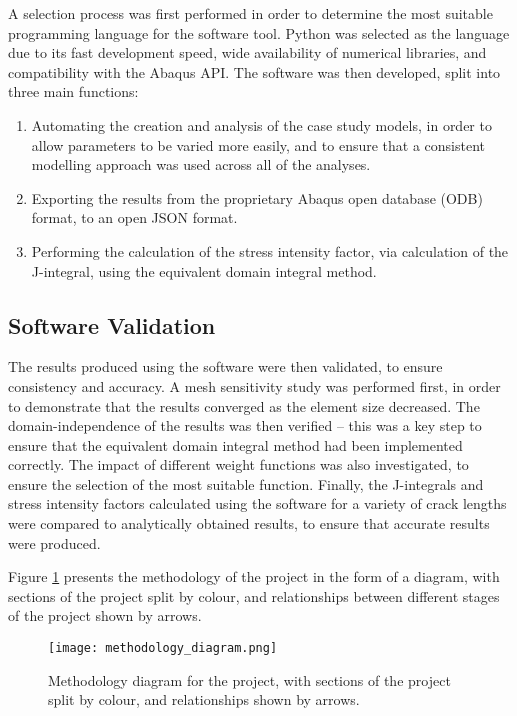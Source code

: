 A selection process was first performed in order to determine the most suitable programming language for the software tool. Python was selected as the language due to its fast development speed, wide availability of numerical libraries, and compatibility with the Abaqus API. The software was then developed, split into three main functions:

\begin{enumerate}
	\item Automating the creation and analysis of the case study models, in order to allow parameters to be varied more easily, and to ensure that a consistent modelling approach was used across all of the analyses.
	\item Exporting the results from the proprietary Abaqus open database (ODB) format, to an open JSON format.
	\item Performing the calculation of the stress intensity factor, via calculation of the J-integral, using the equivalent domain integral method.
\end{enumerate}

\subsection{Software Validation}

The results produced using the software were then validated, to ensure consistency and accuracy. A mesh sensitivity study was performed first, in order to demonstrate that the results converged as the element size decreased. The domain-independence of the results was then verified -- this was a key step to ensure that the equivalent domain integral method had been implemented correctly. The impact of different weight functions was also investigated, to ensure the selection of the most suitable function. Finally, the J-integrals and stress intensity factors calculated using the software for a variety of crack lengths were compared to analytically obtained results, to ensure that accurate results were produced.

\newpage

Figure \ref{fig:methodology_diagram} presents the methodology of the project in the form of a diagram, with sections of the project split by colour, and relationships between different stages of the project shown by arrows.

\begin{figure}[H]
	\centering
	\texttt{[image: methodology\_diagram.png]}
	\caption{Methodology diagram for the project, with sections of the project split by colour, and relationships shown by arrows.}
	\label{fig:methodology_diagram}
\end{figure}

